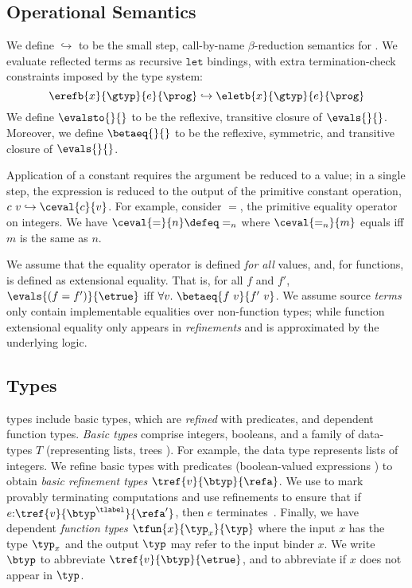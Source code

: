 \subsection{Operational Semantics}
We define $\hookrightarrow$ to be the small step, call-by-name
$\beta$-reduction semantics for \corelan.
%
We evaluate reflected terms %
as recursive $\mathtt{let}$ bindings, with extra termination-check
constraints imposed by the type system:
%
$$
\erefb{x}{\gtyp}{e}{\prog}
\hookrightarrow
\eletb{x}{\gtyp}{e}{\prog}
$$
%
We define $\evalsto{}{}$ to be the reflexive,
transitive closure of $\evals{}{}$.
%
Moreover, we define $\betaeq{}{}$ to be the reflexive,
symmetric, and transitive closure of $\evals{}{}$.

 Application of a constant requires the
argument be reduced to a value; in a single step, the
expression is reduced to the output of the primitive
constant operation, \ie ${c\ v} \hookrightarrow \ceval{c}{v}$.
%
For example, consider $=$, the primitive equality
operator on integers.
%
We have $\ceval{=}{n} \defeq =_n$
where $\ceval{=_n}{m}$ equals \etrue
iff $m$ is the same as $n$.
%

We assume that the equality operator
is defined \emph{for all} values,
and, for functions, is defined as
extensional equality.
%
That is, for all
$f$ and
$f'$,
$\evals{(f = f')}{\etrue}$
   $\mbox{iff}$
  $\forall v.\ \betaeq{f\ v}{f'\ v}$.
%
We assume source \emph{terms} only contain implementable equalities
over non-function types; while function extensional equality only appears
in \emph{refinements} and is approximated by the underlying logic.


\subsection{Types}

\corelan types include basic types, which are \emph{refined} with predicates,
and dependent function types.
%
\emph{Basic types} \btyp comprise integers, booleans, and a family of data-types
$T$ (representing lists, trees \etc).
%
For example, the data type \tintlist represents lists of integers.
%
We refine basic types with predicates (boolean-valued expressions ) to obtain
\emph{basic refinement types} $\tref{v}{\btyp}{\refa}$.
%
%
We use \tlabel to mark provably terminating
computations and use
refinements to ensure that if
${{e}\text{:}{\tref{v}{\btyp^\tlabel}{\refa'}}}$,
then $e$ terminates~\citep{Vazou14}.
%
Finally, we have dependent \emph{function types} $\tfun{x}{\typ_x}{\typ}$
where the input $x$ has the type $\typ_x$ and the output $\typ$ may
refer to the input binder $x$.
%
We write $\btyp$ to abbreviate $\tref{v}{\btyp}{\etrue}$,
and  to abbreviate  if
$x$ does not appear in $\typ$.
%

